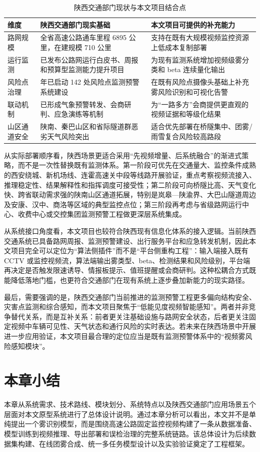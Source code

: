 \begin{table}[H]
  \centering
  \caption{陕西交通部门现状与本文项目结合点}
  \label{tab:shaanxi_context}
  \small
  \begin{tabular}{@{}>{\raggedright\arraybackslash}p{1.9cm}>{\raggedright\arraybackslash}p{4.9cm}>{\raggedright\arraybackslash}p{6.9cm}@{}}
    \toprule
    维度 & 陕西交通部门现实基础 & 本文项目可提供的补充能力 \\
    \midrule
    路网规模 & 全省高速公路通车里程 6895 公里，在建规模 710 公里 & 支持在既有大规模视频监控资源上低成本复制部署 \\
    运行监测 & 已发布公路网运行白皮书、周报和预算型监测能力提升项目 & 为现有监测系统增加视频级雾分类和 beta 连续量化输出 \\
    风险点治理 & 2025 年已启动 142 处风险点监测预警系统建设 & 在既有风险点摄像头基础上补充雾风险识别和可视化告警 \\
    联动机制 & 已形成气象预警转发、会商研判、应急演练等机制 & 为“一路多方”会商提供更直观的视频证据和等级化结果 \\
    山区通道安全 & 陕南、秦巴山区和省际隧道群恶劣天气风险突出 & 适合优先部署在桥隧集中、团雾/雨雪复合风险较高路段 \\
    \bottomrule
  \end{tabular}
\end{table}

从实际部署顺序看，陕西场景更适合采用“先视频增量、后系统融合”的渐进式策略，而不是一次性替换既有监测体系。第一阶段可优先在交通量大、监控条件成熟的西安绕城、新机场线、连霍高速关中段等线路开展验证，重点考察视频流接入、推理稳定性、结果解释性和指挥调度可接受性；第二阶段可向桥隧比高、天气变化快、跨省联动需求强的陕南山区通道拓展，特别是岚皋—陕渝界、大巴山隧道周边及安康、汉中、商洛等区域的典型监控点位；第三阶段再考虑与省级路网运行中心、收费中心或交控集团监测预警工程做更深层系统集成。

从系统接口角度看，本文项目也较符合陕西现有信息化体系的接入逻辑。当前陕西交通系统已具备路网周报、监测预警建设、出行服务平台和应急转发机制，因此本文项目完全可以定位为“算法侧插件”而不是“平台侧重构工程”：输入端接入既有 CCTV 或监控视频流，算法端输出雾类型、beta、检测结果和风险级别，平台端再决定是否触发限速诱导、情报板提示、值班提醒或会商研判。这种松耦合方式既能降低落地门槛，也更符合交通部门在现有系统上逐步叠加新能力的现实路径。

最后，需要强调的是，陕西交通部门当前推进的监测预警工程更多偏向结构安全、灾害点监测和综合感知，而本文项目聚焦于“低能见度视频智能感知”。两者并非竞争替代关系，而是互补关系：前者更关注基础设施与路网安全状态，后者更关注固定视频中车辆可见性、天气状态和通行风险的实时表达。若未来在陕西场景中开展进一步应用验证，本文项目最合理的定位应当是既有监测预警体系中的“视频雾风险感知模块”。

\section{本章小结}

本章从系统需求、技术路线、模块划分、系统特点以及陕西交通部门应用场景五个层面对本文原型系统进行了总体设计说明。通过本章分析可以看出，本文并不是单纯提出一个雾识别模型，而是围绕高速公路固定监控视频构建了一条从数据准备、模型训练到视频推理、导出部署和误检治理的完整系统链路。该总体设计为后续数据集构建、在线团雾合成、统一多任务模型设计以及实验验证奠定了工程框架。
